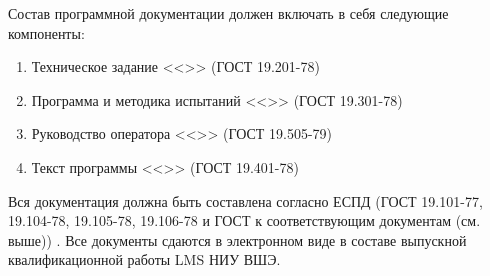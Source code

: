 Состав программной документации должен включать в себя следующие компоненты:
\begin{enumerate}
	\item Техническое задание <<>> (ГОСТ 19.201-78) \label{tz}
	\item Программа и методика испытаний <<>> (ГОСТ 19.301-78) \label{pmi}
	\item Руководство оператора <<>> (ГОСТ 19.505-79) \label{ro}
	\item Текст программы <<>> (ГОСТ 19.401-78) \label{tp}
\end{enumerate}

\indent
Вся документация должна быть составлена согласно ЕСПД (ГОСТ 19.101-77, 19.104-78, 19.105-78, 19.106-78 и ГОСТ к соответствующим документам (см. выше)) \cite{gost}. Все документы сдаются в электронном виде в составе выпускной квалификационной работы LMS НИУ ВШЭ.

